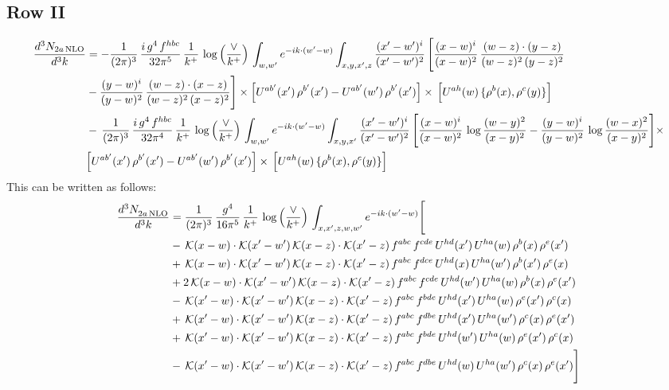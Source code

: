 \documentclass[9pt]{article}
\numberwithin{equation}{section}
\begin{document}
\subsection{Row II}
\begin{align}
\frac{d^{3}N_{2a\,\rm NLO}}{d^{3}k} & =  -\frac{1}{(2\pi)^{3}}\,\frac{i\,g^{4}\,f^{hbc}}{32\pi^{5}}\,\frac{1}{k^{+}}\,\log{\left(\frac{\vee}{k^{+}}\right)}\,
\int_{w,w'} e^{-ik\cdot(w'-w)}\int_{x,y,x',z}\frac{(x'-w')^{i}}{(x'-w')^{2}}\,\Bigg[\frac{(x-w)^{i}}{(x-w)^{2}}\, \frac{(w-z)\cdot (y-z)}{(w-z)^{2}\,(y-z)^{2}}\notag \\ & - \frac{(y-w)^{i}}{(y-w)^{2}}\, \frac{(w-z)\cdot (x-z)}{(w-z)^{2}\,(x-z)^{2}}\Bigg]\times\Big[U^{ab'}(x')\,\rho^{b'}(x')-U^{ab'}(w')\,\rho^{b'}(x')\Big]\times\, \Big[U^{ah}(w)\,\{\rho^{b}(x),\rho^{c}(y)\}\Big] \notag \\
& -\,\frac{1}{(2\pi)^{3}}\,\frac{i\,g^{4}\,f^{hbc}}{32\pi^{4}}\,\frac{1}{k^{+}}\,\log{\left(\frac{\vee}{k^{+}}\right)}\,
\int_{w,w'} e^{-ik\cdot(w'-w)}\int_{x,y,x'}\frac{(x'-w')^{i}}{(x'-w')^{2}}\,\Bigg[\frac{(x-w)^{i}}{(x-w)^{2}}\,\log\frac{(w-y)^{2}}{(x-y)^{2}}-\frac{(y-w)^{i}}{(y-w)^{2}}\,\log\frac{(w-x)^{2}}{(x-y)^{2}}\Bigg]\times\notag \\ & \Big[U^{ab'}(x')\,\rho^{b'}(x')-U^{ab'}(w')\,\rho^{b'}(x')\Big]\times\, \Big[U^{ah}(w)\,\{\rho^{b}(x),\rho^{c}(y)\}\Big]
\end{align}
This can be written as follows: 
\begin{align}
\frac{d^{3}N_{2a\,\rm NLO}^{\rm}}{d^{3}k}  & = \frac{1}{(2\pi)^{3}}\,\frac{g^{4}}{16\pi^{5}}\,\frac{1}{k^{+}}\,\log{\left(\frac{\vee}{k^{+}}\right)}\, \int_{x,x',z,w,w'}e^{-ik\cdot(w'-w)}\Bigg[\notag\\
&-\,\mathcal{K}(x-w)\cdot\mathcal{K}(x'-w')\,\mathcal{K}(x-z)\cdot\mathcal{K}(x'-z)\,f^{abc}\,f^{cde}\,U^{hd}(x')\,U^{ha}(w)\,\rho^{b}(x)\,\rho^{e}(x')\notag\\
&+\,\mathcal{K}(x-w)\cdot\mathcal{K}(x'-w')\,\mathcal{K}(x-z)\cdot\mathcal{K}(x'-z)\,f^{abc}\,f^{dce}\,U^{hd}(x)\,U^{ha}(w')\,\rho^{b}(x')\,\rho^{e}(x)\notag\\
&+2\,\mathcal{K}(x-w)\cdot\mathcal{K}(x'-w')\,\mathcal{K}(x-z)\cdot\mathcal{K}(x'-z)\,f^{abc}\,f^{cde}\,U^{hd}(w')\,U^{ha}(w)\,\rho^{b}(x)\,\rho^{e}(x')\notag\\
&-\,\mathcal{K}(x'-w)\cdot\mathcal{K}(x'-w')\,\mathcal{K}(x-z)\cdot\mathcal{K}(x'-z)\,f^{abc}\,f^{bde}\,U^{hd}(x')\,U^{ha}(w)\,\rho^{e}(x')\,\rho^{c}(x)\notag\\
&+\,\mathcal{K}(x'-w)\cdot\mathcal{K}(x'-w')\,\mathcal{K}(x-z)\cdot\mathcal{K}(x'-z)\,f^{abc}\,f^{dbe}\,U^{hd}(x')\,U^{ha}(w')\,\rho^{c}(x)\,\rho^{e}(x')\notag\\
&+\,\mathcal{K}(x'-w)\cdot\mathcal{K}(x'-w')\,\mathcal{K}(x-z)\cdot\mathcal{K}(x'-z)\,f^{abc}\,f^{bde}\,U^{hd}(w')\,U^{ha}(w)\,\rho^{e}(x')\,\rho^{c}(x)\notag\\
&-\,\mathcal{K}(x'-w)\cdot\mathcal{K}(x'-w')\,\mathcal{K}(x-z)\cdot\mathcal{K}(x'-z)\,f^{abc}\,f^{dbe}\,U^{hd}(w)\,U^{ha}(w')\,\rho^{c}(x)\,\rho^{e}(x')\Bigg]
\end{align}
\end{document}
